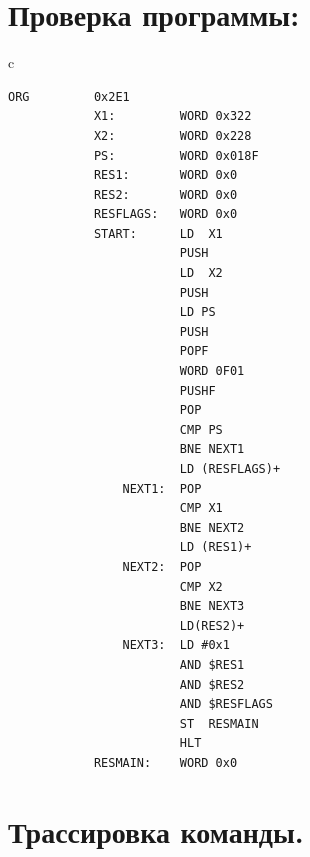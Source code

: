 \section{Проверка программы:}
\begin{center}
    \begin{tabular}{c}
        \begin{lstlisting}[basicstyle=\ttfamily\tiny]
            ORG         0x2E1
            X1:         WORD 0x322
            X2:         WORD 0x228
            PS:         WORD 0x018F
            RES1:       WORD 0x0
            RES2:       WORD 0x0
            RESFLAGS:   WORD 0x0
            START:      LD  X1
                        PUSH
                        LD  X2
                        PUSH
                        LD PS
                        PUSH
                        POPF
                        WORD 0F01
                        PUSHF
                        POP
                        CMP PS
                        BNE NEXT1
                        LD (RESFLAGS)+
                NEXT1:  POP
                        CMP X1
                        BNE NEXT2
                        LD (RES1)+
                NEXT2:  POP
                        CMP X2
                        BNE NEXT3
                        LD(RES2)+
                NEXT3:  LD #0x1
                        AND $RES1
                        AND $RES2
                        AND $RESFLAGS
                        ST  RESMAIN
                        HLT
            RESMAIN:    WORD 0x0
        \end{lstlisting}
    \end{tabular}
\end{center}

\section{Трассировка команды.}

